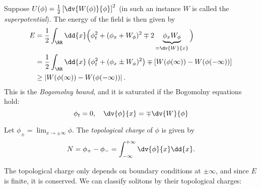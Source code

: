 \documentclass{jknotes}
\begin{document}
\begin{eg}
    Suppose \(U(\phi)=\frac{1}{2}\left[\dv{W(\phi)}{\phi}\right]^2\) (in such an instance \(W\) is called the \emph{superpotential}). The energy of the field is then given by 
    \begin{align}
        E &= \frac{1}{2} \int_\RR \dd{x} \Big(\phi_t^2+(\phi_x+W_\phi)^2 \mp 2 \underbrace{\phi_xW_\phi}_{=\dv{W}{x}}\Big) \\
          &= \frac{1}{2} \int_\RR \dd{x} \left(\phi_t^2 + (\phi_x \pm W_\phi)^2\right) \mp \left[W(\phi(\infty))-W(\phi(-\infty))\right] \\
          &\ge \left|W(\phi(\infty)) - W(\phi(-\infty))\right|.
    \end{align}
    This is the \emph{Bogomolny bound}, and it is saturated if the Bogomolny equations hold:
    \begin{equation}
        \phi_t=0,\quad \dv{\phi}{x} = \mp \dv{W}{\phi}
    \end{equation}
\end{eg}

\begin{defn}
    Let \(\phi_\pm = \lim_{x\to\pm\infty}\phi\). The \emph{topological charge} of \(\phi\) is given by
    \begin{equation}
        N = \phi_+ - \phi_- = \int_{-\infty}^{+\infty} \dv{\phi}{x} \dd{x}.
    \end{equation}
\end{defn}
The topological charge only depends on boundary conditions at \(\pm\infty\), and since \(E\) is finite, it is conserved. We can classify solitons by their topological charges:
\end{document}
